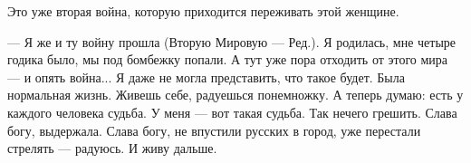 Это уже вторая война, которую приходится переживать этой женщине. 

— Я же и ту войну прошла (Вторую Мировую — Ред.). Я родилась, мне четыре годика
было, мы под бомбежку попали. А тут уже пора отходить от этого мира — и опять
война... Я даже не могла представить, что такое будет. Была нормальная жизнь.
Живешь себе, радуешься понемножку. А теперь думаю: есть у каждого человека
судьба. У меня — вот такая судьба. Так нечего грешить. Слава богу, выдержала.
Слава богу, не впустили русских в город, уже перестали стрелять — радуюсь. И
живу дальше.
